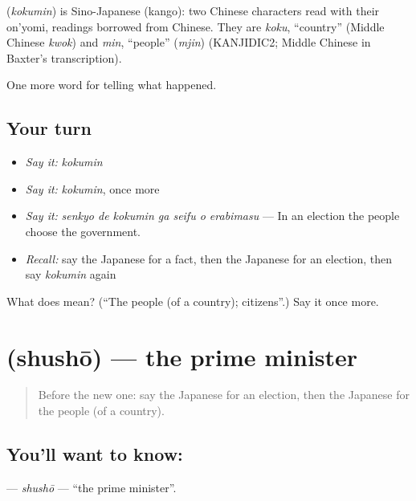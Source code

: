 \begin{cousinweb}
\textbf{} (\emph{kokumin}) is Sino-Japanese (kango): two Chinese characters read with their on'yomi, readings borrowed from Chinese. They are \emph{koku}, \textquotedblleft{}country\textquotedblright{} (Middle Chinese \emph{kwok}) and \emph{min}, \textquotedblleft{}people\textquotedblright{} (\emph{mjin}) (KANJIDIC2; Middle Chinese in Baxter's transcription).
\end{cousinweb}

\begin{grammarlens}[title={What you've built}]
One more word for telling what happened.
\end{grammarlens}

\subsection*{Your turn}
\begin{itemize}
\raggedright
  \item \emph{Say it:} \emph{kokumin}
  \item \emph{Say it:} \emph{kokumin}, once more
  \item \emph{Say it:} \emph{senkyo de kokumin ga seifu o erabimasu} — In an election the people choose the government.
  \item \emph{Recall:} say the Japanese for a fact, then the Japanese for an election, then say \emph{kokumin} again
\end{itemize}

\begin{tcolorbox}[breakable,colback=teal!4,colframe=teal!35!black,title={Before you move on}]
What does  mean? (\textquotedblleft{}The people (of a country); citizens\textquotedblright{}.) Say it once more.
\end{tcolorbox}
\section[\texorpdfstring{\ja{しゅしょう} (shushō)}{しゅしょう (shushō)}]{ (shushō) — the prime minister}

\label{lesson:JA-C284-shushou}



\begin{quote}
Before the new one: say the Japanese for an election, then the Japanese for the people (of a country).
\end{quote}

\subsection*{You'll want to know: }
\textbf{} — \emph{shushō} — \textquotedblleft{}the prime minister\textquotedblright{}.

